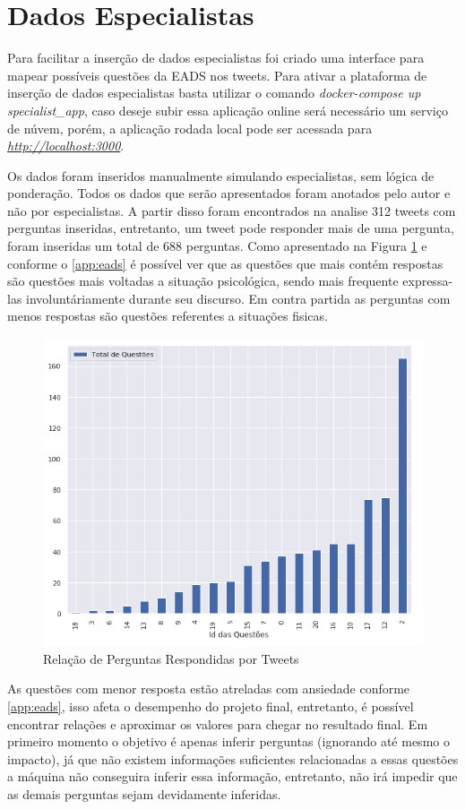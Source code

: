 \section{Dados Especialistas}
Para facilitar a inserção de dados especialistas foi criado uma interface para mapear possíveis questões da EADS nos tweets. Para ativar a plataforma de inserção de dados especialistas basta utilizar o comando \textit{docker-compose up specialist\_app}, caso deseje subir essa aplicação online será necessário um serviço de núvem, porém, a aplicação rodada local pode ser acessada para \textit{\url{http://localhost:3000}}.

Os dados foram inseridos manualmente simulando especialistas, sem lógica de ponderação. Todos os dados que serão apresentados foram anotados pelo autor e não por especialistas. A partir disso foram encontrados na analise 312 tweets com perguntas inseridas, entretanto, um tweet pode responder mais de uma pergunta, foram inseridas um total de 688 perguntas. Como apresentado na Figura \ref{fig:question-balance} e conforme o \ref{app:eads} é possível ver que as questões que mais contém respostas são questões mais voltadas a situação psicológica, sendo mais frequente expressa-las involuntáriamente durante seu discurso. Em contra partida as perguntas com menos respostas são questões referentes a situações fisicas.

\begin{figure}[!ht]
    \centering
    \includegraphics[width=.55\textwidth]{imagens/question-balance.png}
    \caption{Relação de Perguntas Respondidas por Tweets}
    \label{fig:question-balance}
\end{figure}

As questões com menor resposta estão atreladas com ansiedade conforme \ref{app:eads}, isso afeta o desempenho do projeto final, entretanto, é possível encontrar relações e aproximar os valores para chegar no resultado final. Em primeiro momento o objetivo é apenas inferir perguntas (ignorando até mesmo o impacto), já que não existem informações suficientes relacionadas a essas questões a máquina não conseguira inferir essa informação, entretanto, não irá impedir que as demais perguntas sejam devidamente inferidas.

